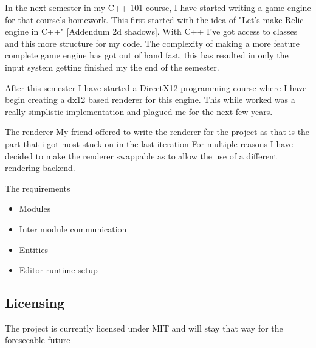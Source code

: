 In the next semester in my C++ 101 course, I have started writing a game engine for that course's homework.
This first started with the idea of "Let's make Relic engine in C++" [Addendum 2d shadows].
With C++ I've got access to classes and this more structure for my code.
The complexity of making a more feature complete game engine has got out of hand fast,
this has resulted in only the input system getting finished my the end of the semester.

After this semester I have started a DirectX12 programming course where I have begin creating a dx12 based renderer for this engine.
This while worked was a really simplistic implementation and plagued me for the next few years.

The renderer
My friend offered to write the renderer for the project as that is the part that i got most stuck on in the last iteration
For multiple reasons I have decided to make the renderer swappable as to allow the use of a different rendering backend.

The requirements
\begin{itemize}
    \item Modules
    \item Inter module communication
    \item Entities
    \item Editor runtime setup
\end{itemize}

\subsection{Licensing}

The project is currently licensed under MIT and will stay that way for the foreseeable future
